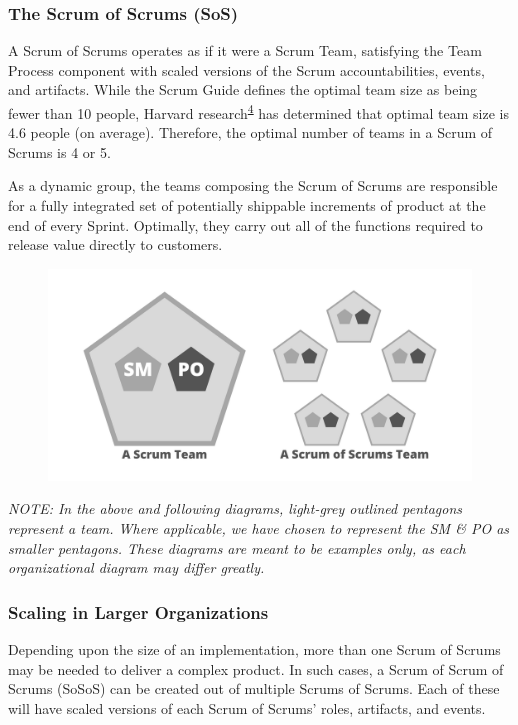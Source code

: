 \documentclass[12pt,a4paper,parskip=full]{scrartcl}
\begin{document}
\subsubsection{The Scrum of Scrums (SoS)}\label{the-scrum-of-scrums}

A Scrum of Scrums operates as if it were a Scrum Team, satisfying the Team Process component with scaled versions of the Scrum accountabilities, events, and artifacts. While the Scrum Guide defines the optimal team size as being fewer than 10 people, Harvard research\textsuperscript{\hyperref[citation4]{4}}  has determined that optimal team size is 4.6 people (on average). Therefore, the optimal number of teams in a Scrum of Scrums is 4 or 5.

As a dynamic group, the teams composing the Scrum of Scrums are responsible for a fully integrated set of potentially shippable increments of product at the end of every Sprint. Optimally, they carry out all of the functions required to release value directly to customers.


\begin{figure}[H]
    \centering
    \includegraphics[scale=0.15]{1.png}
\end{figure}


\emph{
 NOTE: In the above and following diagrams, light-grey outlined pentagons represent a team. Where applicable, we have chosen to represent the SM \& PO as smaller pentagons. These diagrams are meant to be examples only, as each organizational diagram may differ greatly.}

\subsubsection{Scaling in Larger
Organizations}\label{scaling-in-larger-organizations}

Depending upon the size of an implementation, more than one Scrum of
Scrums may be needed to deliver a complex product. In such cases, a
Scrum of Scrum of Scrums (SoSoS) can be created out of multiple Scrums
of Scrums. Each of these will have scaled versions of each Scrum of
Scrums' roles, artifacts, and events.
\end{document}
